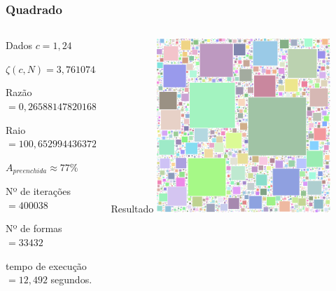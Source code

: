 \documentclass[aspectratio=169]{beamer}
\begin{document}
\begin{frame}
\frametitle{Quadrado}
\begin{columns}[T]
\begin{column}{.5\textwidth}
\begin{block}{\centering Dados}
$c=1,24$
\smallskip

$\zeta(c,N)=3,7610743206468737$
\smallskip

Razão $=0,26588147820168795$
\smallskip

Raio $=100,65299443637255$
\smallskip

$A_{preenchida} \approx 77\%$
\smallskip

Nº de iterações $=400038$
\smallskip

Nº de formas $=33432$
\smallskip

tempo de execução $= 12,492$ segundos.
\smallskip
\end{block}
\end{column}

\begin{column}{.5\textwidth}
\begin{block}{\centering Resultado}
\centering
\includegraphics[width=0.7\textwidth]{exemplo6}
\end{block}
\end{column}
\end{columns}
\end{frame}
\end{document}
